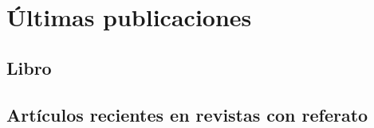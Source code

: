 \section*{Últimas publicaciones}

\subsection*{Libro}

\begin{timeline}
 \libropython
\end{timeline}

\subsection*{Artículos recientes en revistas con referato}

\renewcommand{\cvminyear}{2024}
\begin{ntimeline}
	
\end{ntimeline}
